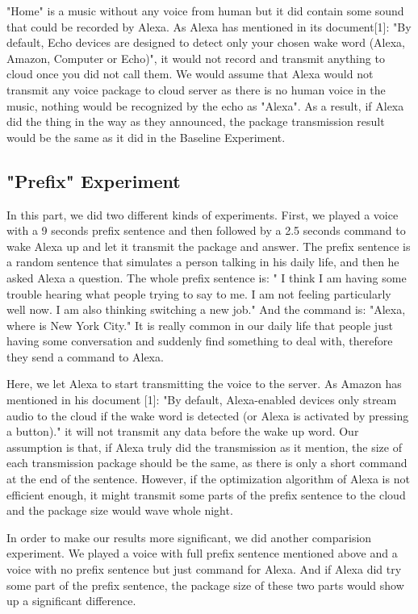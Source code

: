 "Home" is a music without any voice from human but it did contain some sound that could be recorded by Alexa. As Alexa has mentioned in its document[1]: "By default, Echo devices are designed to detect only your chosen wake word (Alexa, Amazon, Computer or Echo)", it would not record and transmit anything to cloud once you did not call them. We would assume that Alexa would not transmit any voice package to cloud server as there is no human voice in the music, nothing would be recognized by the echo as "Alexa". As a result, if Alexa did the thing in the way as they announced, the package transmission result would be the same as it did in the Baseline Experiment.

\subsection{"Prefix" Experiment}

In this part, we did two different kinds of experiments. First, we played a voice with a 9 seconds prefix sentence and then followed by a 2.5 seconds command to wake Alexa up and let it transmit the package and answer. The prefix sentence is a random sentence that simulates a person talking in his daily life, and then he asked Alexa a question. The whole prefix sentence is: " I think I am having some trouble hearing what people trying to say to me. I am not feeling particularly well now. I am also thinking switching a new job." And the command is: "Alexa, where is New York City." It is really common in our daily life that people just having some conversation and suddenly find something to deal with, therefore they send a command to Alexa.

Here, we let Alexa to start transmitting the voice to the server. As Amazon has mentioned in his document [1]: "By default, Alexa-enabled devices only stream audio to the cloud if the wake word is detected (or Alexa is activated by pressing a button)." it will not transmit any data before the wake up word. Our assumption is that, if Alexa truly did the transmission as it mention, the size of each transmission package should be the same, as there is only a short command at the end of the sentence. However, if the optimization algorithm of Alexa is not efficient enough, it might transmit some parts of the prefix sentence to the cloud and the package size would wave whole night.

In order to make our results more significant, we did another comparision experiment. We played a voice with full prefix sentence mentioned above and a voice with no prefix sentence but just command for Alexa. And if Alexa did try some part of the prefix sentence, the package size of these two parts would show up a significant difference.

